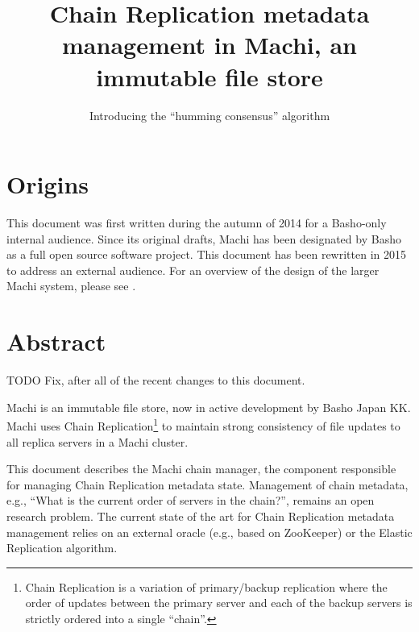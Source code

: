 \documentclass[preprint,10pt]{sigplanconf}
\begin{document}

\conferenceinfo{}{} 


\title{Chain Replication metadata management in Machi, an immutable
  file store}
\subtitle{Introducing the ``humming consensus'' algorithm}


\maketitle

\section{Origins}
\label{sec:origins}

This document was first written during the autumn of 2014 for a
Basho-only internal audience.  Since its original drafts, Machi has
been designated by Basho as a full open source software project.  This
document has been rewritten in 2015 to address an external audience.
For an overview of the design of the larger Machi system, please see
\cite{machi-design}.

\section{Abstract}
\label{sec:abstract}

TODO Fix, after all of the recent changes to this document.

Machi is an immutable file store, now in active development by Basho
Japan KK.  Machi uses Chain Replication\footnote{Chain
Replication is a variation of primary/backup replication where the
order of updates between the primary server and each of the backup
servers is strictly ordered into a single ``chain''.}
to maintain strong consistency
of file updates to all replica servers in a Machi cluster.  

This document describes the Machi chain manager, the component
responsible for managing Chain Replication metadata state.
Management of
chain metadata, e.g., ``What is the current order of
servers in the chain?'', remains an open research problem.  The
current state of the art for Chain Replication metadata management
relies on an external oracle (e.g., based on ZooKeeper) or the Elastic
Replication \cite{elastic-chain-replication} algorithm.
\end{document}
